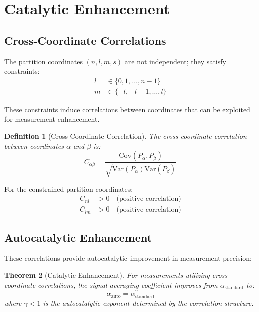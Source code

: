 \documentclass[twocolumn,10pt]{article}
\newtheorem{theorem}{Theorem}[section]
\newtheorem{definition}[theorem]{Definition}
\begin{document}
\section{Catalytic Enhancement}
\label{sec:catalysis}

\subsection{Cross-Coordinate Correlations}

The partition coordinates $(n, l, m, s)$ are not independent; they satisfy constraints:
\begin{align}
    l &\in \{0, 1, \ldots, n-1\} \\
    m &\in \{-l, -l+1, \ldots, l\}
\end{align}

These constraints induce correlations between coordinates that can be exploited for measurement enhancement.

\begin{definition}[Cross-Coordinate Correlation]
The cross-coordinate correlation between coordinates $\alpha$ and $\beta$ is:
\begin{equation}
    C_{\alpha\beta} = \frac{\text{Cov}(P_\alpha, P_\beta)}{\sqrt{\text{Var}(P_\alpha) \text{Var}(P_\beta)}}
\end{equation}
\end{definition}

For the constrained partition coordinates:
\begin{align}
    C_{nl} &> 0 \quad \text{(positive correlation)} \\
    C_{lm} &> 0 \quad \text{(positive correlation)}
\end{align}

\subsection{Autocatalytic Enhancement}

These correlations provide autocatalytic improvement in measurement precision:

\begin{theorem}[Catalytic Enhancement]
\label{thm:catalysis}
For measurements utilizing cross-coordinate correlations, the signal averaging coefficient improves from $\alpha_{\text{standard}}$ to:
\begin{equation}
    \alpha_{\text{auto}} = \alpha_{\text{standard}}^{\gamma}
\end{equation}
where $\gamma < 1$ is the autocatalytic exponent determined by the correlation structure.
\end{theorem}
\end{document}

